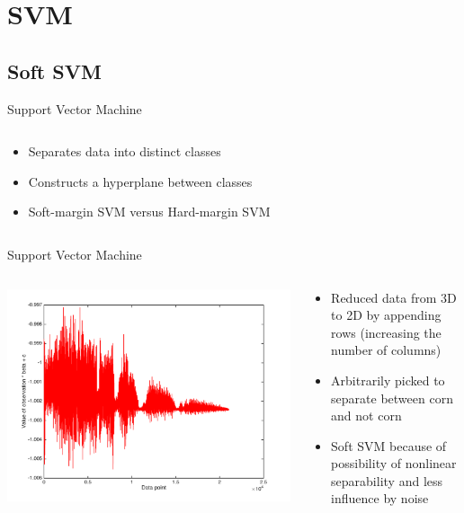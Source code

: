 \documentclass[11pt]{beamer}
\begin{document}

\section{SVM}
\subsection{Soft SVM}
\begin{frame}{Support Vector Machine}
\begin{columns}[T]
\begin{column}{.48\textwidth}
\begin{itemize}
\item Separates data into distinct classes
\item Constructs a hyperplane between classes
\item Soft-margin SVM versus Hard-margin SVM
\end{itemize}
\end{column}
\hfill
\begin{column}{.48\textwidth}
\end{column}
\end{columns}
\end{frame}

\begin{frame}{Support Vector Machine}
\begin{columns}[T]
\begin{column}{.48\textwidth}
\includegraphics[scale=.3]{softsvmImage.png}
\end{column}
\hfill
\begin{column}{.48\textwidth}
\begin{itemize}
\item Reduced data from 3D to 2D by appending rows (increasing the number of columns)
\item Arbitrarily picked to separate between corn and not corn
\item Soft SVM because of possibility of nonlinear separability and less influence by noise
\end{itemize}
\end{column}
\end{columns}
\end{frame}
\end{document}

